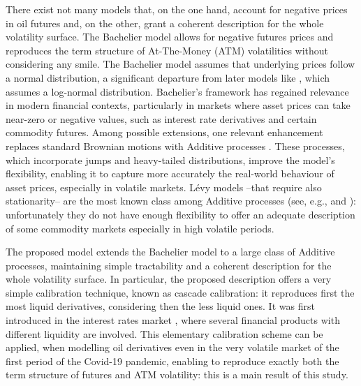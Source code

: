 \documentclass[12pt]{article}
\theoremstyle{definition}
\theoremstyle{remark}
\numberwithin{theorem}{section}
\numberwithin{proposition}{section}
\numberwithin{lemma}{section}
\numberwithin{corollary}{section}
\numberwithin{definition}{section}
\numberwithin{remark}{section}
\numberwithin{example}{section}
\begin{document}
There exist not many models that, on the one hand, account for negative prices in oil futures and, on the other, grant a coherent description 
for the whole volatility surface.
The Bachelier model \citep{bachelier1900jeu,davis2006} allows for negative futures prices and reproduces the term structure of At-The-Money (ATM) volatilities without considering any smile. The Bachelier model assumes that underlying prices follow a normal distribution, a significant departure from later models like \cite{black1973pricing}, which assumes a log-normal distribution. Bachelier’s framework has regained relevance in modern financial contexts, particularly in markets where asset prices can take near-zero or negative values, such as interest rate derivatives and certain commodity futures. Among possible extensions, one relevant enhancement replaces standard Brownian motions with Additive processes \citep[for a comprehensive description of the properties of these processes see, e.g.,][]{Sato}. These processes, which incorporate jumps and heavy-tailed distributions, improve the model’s flexibility, enabling it to capture more accurately the real-world behaviour of asset prices, especially in volatile markets. L\'evy models --that require also stationarity-- are the most known class among Additive processes (see, e.g., \citeauthor{benth2008stochastic} \citeyear{benth2008stochastic} and \citeauthor{Cont} \citeyear{Cont}): unfortunately they do not have enough flexibility to offer an adequate description of some commodity markets especially in high volatile periods.

\smallskip

The proposed model extends the Bachelier model to a large class of Additive processes, maintaining simple tractability and a coherent description for the whole volatility surface.
In particular, the proposed description offers a very simple calibration technique, known as cascade calibration: it reproduces first the most liquid derivatives, considering then the less liquid ones. It was first introduced in the interest rates market \citep[see, e.g.,][]{brigo2005empirically}, where several financial products with different liquidity are involved. This elementary calibration scheme can be applied, when modelling oil derivatives even in the very volatile market of the first period of the Covid-19 pandemic, enabling to reproduce exactly both the term structure of futures and ATM volatility: this is a main result of this study.
\end{document}
